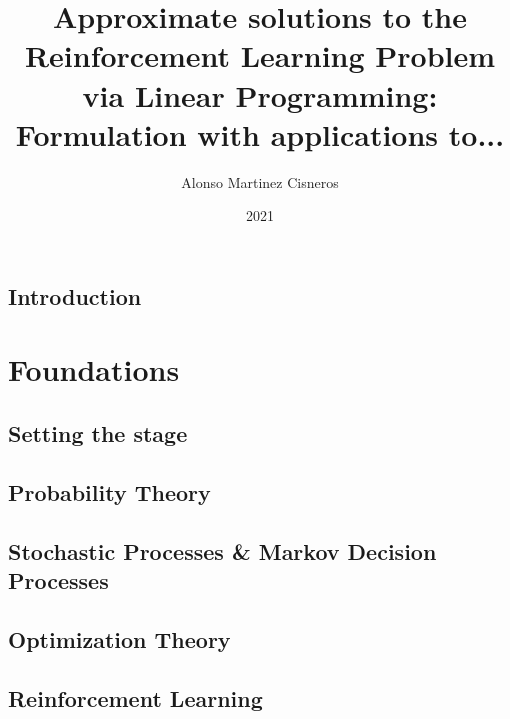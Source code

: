 \documentclass[colorful]{sty/itam-thesis}
\author{Alonso Martinez Cisneros}
\title{Approximate solutions to the Reinforcement Learning 
Problem via Linear Programming: Formulation with applications 
to...}
\date{2021}
\begin{document}
\frontmatter
{}
\maketitle
\makefrontmatter

\cleardoublepage
\pagestyle{plain}






\tableofcontents

\mainmatter


% 
\chapter*{Introduction}




\part{Foundations}

\chapter{Setting the stage}


\chapter{Probability Theory}
\chapter{Stochastic Processes \& Markov Decision Processes}
\chapter{Optimization Theory}
\chapter{Reinforcement Learning}

\nocite{*}
\printbibliography
\end{document}
